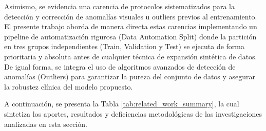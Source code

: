 Asimismo, se evidencia una carencia de protocolos sistematizados para la detección y corrección de anomalías visuales u outliers previos al entrenamiento. El presente trabajo aborda de manera directa estas carencias implementando un pipeline de automatización rigurosa (Data Automation Split) donde la partición en tres grupos independientes (Train, Validation y Test) se ejecuta de forma prioritaria y absoluta antes de cualquier técnica de expansión sintética de datos. De igual forma, se integra el uso de algoritmos avanzados de detección de anomalías (Outliers) para garantizar la pureza del conjunto de datos y asegurar la robustez clínica del modelo propuesto.

A continuación, se presenta la Tabla \ref{tab:related_work_summary}, la cual sintetiza los aportes, resultados y deficiencias metodológicas de las investigaciones analizadas en esta sección.

